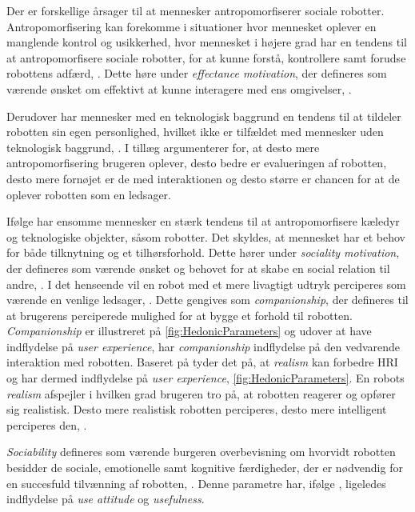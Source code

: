 Der er forskellige årsager til at mennesker antropomorfiserer sociale robotter. Antropomorfisering kan forekomme i situationer hvor mennesket oplever en manglende kontrol og usikkerhed, hvor mennesket i højere grad har en tendens til at antropomorfisere sociale robotter, for at kunne forstå, kontrollere samt forudse robottens adfærd, \parencite[s. 1478]{PDF:ExploringInfluencingVariable}. Dette høre under \textit{effectance motivation}, der defineres som værende ønsket om effektivt at kunne interagere med ens omgivelser, \parencite[s. 62]{PDF:EffectsOfAnticipatedHRI}.

Derudover har mennesker med en teknologisk baggrund en tendens til at tildeler robotten sin egen personlighed, hvilket ikke er tilfældet med mennesker uden teknologisk baggrund, \parencite[s. 19]{PDF:CloseButNotStuck}. I tillæg argumenterer \textcite[s. 2]{PDF:SharingALifeHarvey} for, at desto mere antropomorfisering brugeren oplever, desto bedre er evalueringen af robotten, desto mere fornøjet er de med interaktionen og desto større er chancen for at de oplever robotten som en ledsager.

Ifølge \textcite[s. 61]{PDF:EffectsOfAnticipatedHRI} har ensomme mennesker en stærk tendens til at antropomorfisere kæledyr og teknologiske objekter, såsom robotter. Det skyldes, at mennesket har et behov for både tilknytning og et tilhørsforhold. Dette hører under \textit{sociality motivation}, der defineres som værende ønsket og behovet for at skabe en social relation til andre, \parencite[s. 61]{PDF:EffectsOfAnticipatedHRI}. I det henseende vil en robot med et mere livagtigt udtryk perciperes som værende en venlige ledsager, \parencite[s. 1478]{PDF:ExploringInfluencingVariable}. Dette gengives som \textit{companionship}, der defineres til at brugerens perciperede mulighed for at bygge et forhold til robotten. \textit{Companionship} er illustreret på \autoref{fig:HedonicParameters} og udover at have indflydelse på \textit{user experience}, har \textit{companionship} indflydelse på den vedvarende interaktion med robotten. \blankline
%
Baseret på \textcite[s. 1478]{PDF:ExploringInfluencingVariable} tyder det på, at \textit{realism} kan forbedre HRI og har dermed indflydelse på \textit{user experience}, \autoref{fig:HedonicParameters}. En robots \textit{realism} afspejler i hvilken grad brugeren tro på, at robotten reagerer og opfører sig realistisk. Desto mere realistisk robotten perciperes, desto mere intelligent perciperes den, \parencite[s. 1478]{PDF:ExploringInfluencingVariable}. 

\textit{Sociability} defineres som værende burgeren overbevisning om hvorvidt robotten besidder de sociale, emotionelle samt kognitive færdigheder, der er nødvendig for en succesfuld tilvænning af robotten, \parencite[s. 1478]{PDF:ExploringInfluencingVariable}. Denne parametre har, ifølge \textcite[s. 1478]{PDF:ExploringInfluencingVariable}, ligeledes indflydelse på \textit{use attitude} og \textit{usefulness}. 








